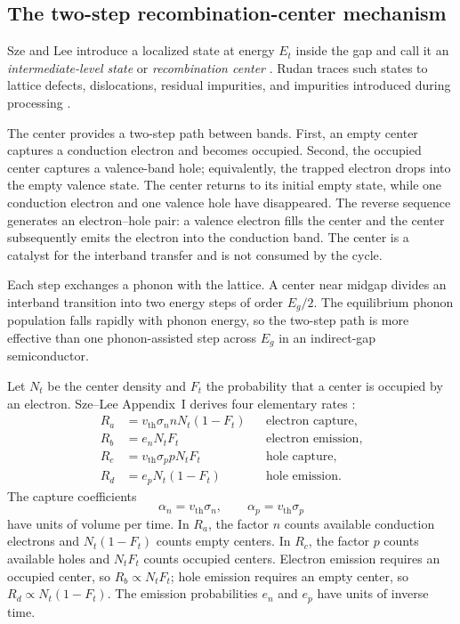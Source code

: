 \subsection{The two-step recombination-center mechanism}

Sze and Lee introduce a localized state at energy $E_t$ inside the gap and call
it an \emph{intermediate-level state} or \emph{recombination center}
\cite[Sec.~2.3.3, Fig.~13 and Eq.~(50)]{szeLee2012}.  Rudan traces such states
to lattice defects, dislocations, residual impurities, and impurities introduced
during processing \cite[Secs.~20.2.2--20.2.3]{rudan2015}.

The center provides a two-step path between bands.  First, an empty center
captures a conduction electron and becomes occupied.  Second, the occupied
center captures a valence-band hole; equivalently, the trapped electron drops
into the empty valence state.  The center returns to its initial empty state,
while one conduction electron and one valence hole have disappeared.  The
reverse sequence generates an electron--hole pair: a valence electron fills the
center and the center subsequently emits the electron into the conduction band.
The center is a catalyst for the interband transfer and is not consumed by the
cycle.

Each step exchanges a phonon with the lattice.  A center near midgap divides an
interband transition into two energy steps of order $E_g/2$.  The equilibrium
phonon population falls rapidly with phonon energy, so the two-step path is more
effective than one phonon-assisted step across $E_g$ in an indirect-gap
semiconductor.

Let $N_t$ be the center density and $F_t$ the probability that a center is
occupied by an electron.  Sze--Lee Appendix~I derives four elementary rates
\cite[Appendix~I, Eqs.~(2)--(14)]{szeLee2012}:
\begin{align}
  R_a&=v_{\mathrm{th}}\sigma_n nN_t(1-F_t)
      &&\text{electron capture},\\
  R_b&=e_nN_tF_t
      &&\text{electron emission},\\
  R_c&=v_{\mathrm{th}}\sigma_p pN_tF_t
      &&\text{hole capture},\\
  R_d&=e_pN_t(1-F_t)
      &&\text{hole emission}.
  \label{eq:srh-four-center-rates}
\end{align}
The capture coefficients
\begin{equation}
  \alpha_n=v_{\mathrm{th}}\sigma_n,
  \qquad
  \alpha_p=v_{\mathrm{th}}\sigma_p
  \label{eq:srh-capture-coefficients}
\end{equation}
have units of volume per time.  In $R_a$, the factor $n$ counts available
conduction electrons and $N_t(1-F_t)$ counts empty centers.  In $R_c$, the
factor $p$ counts available holes and $N_tF_t$ counts occupied centers.
Electron emission requires an occupied center, so $R_b\propto N_tF_t$; hole
emission requires an empty center, so $R_d\propto N_t(1-F_t)$.  The emission
probabilities $e_n$ and $e_p$ have units of inverse time.

